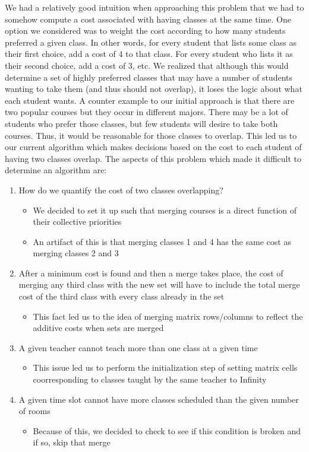 \documentclass[11pt, oneside]{article}   	%
\begin{document}
We had a relatively good intuition when approaching this problem that we had to somehow compute a cost associated with having classes at the same time. One option we considered was to weight the cost according to how many students preferred a given class. In other words, for every student that lists some class as their first choice, add a cost of 4 to that class. For every student who lists it as their second choice, add a cost of 3, etc. We realized that although this would determine a set of highly preferred classes that may have a number of students wanting to take them (and thus should not overlap), it loses the logic about what each student wants. A counter example to our initial approach is that there are two popular courses but they occur in different majors. There may be a lot of students who prefer those classes, but few students will desire to take both courses. Thus, it would be reasonable for those classes to overlap. This led us to our current algorithm which makes decisions based on the cost to each student of having two classes overlap. The aspects of this problem which made it difficult to determine an algorithm are:
\begin{enumerate}
\item{How do we quantify the cost of two classes overlapping?}
\begin{itemize}
\item{We decided to set it up such that merging courses is a direct function of their collective priorities}
\item{An artifact of this is that merging classes 1 and 4 has the same cost as merging classes 2 and 3}
\end{itemize}
\item{After a minimum cost is found and then a merge takes place, the cost of merging any third class with the new set will have to include the total merge cost of the third class with every class already in the set} 
\begin{itemize}
\item{This fact led us to the idea of merging matrix rows/columns to reflect the additive costs when sets are merged}
\end{itemize}
\item{A given teacher cannot teach more than one class at a given time}
\begin{itemize}
\item{This issue led us to perform the initialization step of setting matrix cells coorresponding to classes taught by the same teacher to Infinity}
\end{itemize}
\item{A given time slot cannot have more classes scheduled than the given number of rooms}
\begin{itemize}
\item{Because of this, we decided to check to see if this condition is broken and if so, skip that merge}
\end{itemize}
\end{enumerate}
\end{document}
